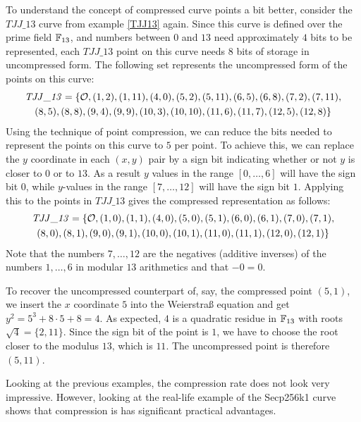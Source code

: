 \begin{example} To understand the concept of compressed curve points a bit better, consider the $\mathit{TJJ\_13}$ curve from example \ref{TJJ13} again. Since this curve is defined over the prime field $\mathbb{F}_{13}$, and numbers between $0$ and $13$ need approximately $4$ bits to be represented, each $\mathit{TJJ\_13}$ point on this curve needs $8$ bits of storage in uncompressed form. The following set represents the uncompressed form of the points on this curve:
\begin{multline*}
\mathit{TJJ\_13} = \{\mathcal{O}, (1, 2), (1, 11), (4, 0), (5, 2), (5, 11), (6, 5), (6, 8), (7,2), (7, 11), \\ (8, 5), (8, 8), (9, 4), (9, 9), (10, 3), (10,
10), (11, 6), (11, 7), (12, 5), (12, 8)\}
\end{multline*}
Using the technique of point compression, we can reduce the bits needed to represent the points on this curve to  $5$ per point. To achieve this, we can replace the $y$ coordinate in each $(x,y)$ pair by a sign bit indicating whether or not $y$ is closer to $0$ or to $13$. As a result $y$ values in the range $[0,\ldots,6]$ will have the sign bit $0$, while $y$-values in the range $[7,\ldots,12]$ will have the sign bit $1$. Applying this to the points in $\mathit{TJJ\_13}$ gives the compressed representation as follows:
\begin{multline*}
\mathit{TJJ\_13} = \{\mathcal{O}, (1, 0), (1, 1), (4, 0), (5, 0), (5, 1), (6, 0), (6, 1), (7,0), (7, 1), \\ (8, 0), (8, 1), (9, 0), (9, 1), (10, 0), (10,1), (11, 0), (11, 1), (12, 0), (12, 1)\}
\end{multline*} 
Note that the numbers $7,\ldots, 12$ are the negatives (additive inverses) of the numbers $1,\ldots, 6$ in modular $13$ arithmetics and that $-0=0$. 

To recover the uncompressed counterpart of, say, the compressed point $(5,1)$, we insert the $x$ coordinate $5$ into the Weierstraß equation and get $y^2 = 5^3 + 8\cdot 5 +8 = 4$. As expected, $4$ is a quadratic residue in $\mathbb{F}_{13}$ with roots $\sqrt{4}= \{2,11\}$. Since the sign bit of the point is $1$, we have to choose the root closer to the modulus $13$, which is $11$. The uncompressed point is therefore $(5,11)$. 
\end{example}
Looking at the previous examples, the compression rate does not look very impressive. However, looking at the real-life example of the Secp256k1 curve shows that compression is has significant practical advantages.
